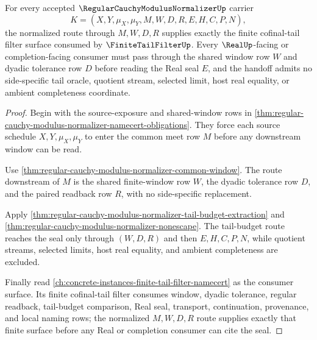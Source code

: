 \begin{theorem}
\label{thm:regular-cauchy-modulus-normalizer-cofinal-filter-handoff}
For every accepted $\RegularCauchyModulusNormalizerUp$ carrier
$$
K=(X,Y,\mu_X,\mu_Y,M,W,D,R,E,H,C,P,N),
$$
the normalized route through $M,W,D,R$ supplies exactly the finite cofinal-tail filter surface consumed by $\FiniteTailFilterUp$. Every $\RealUp$-facing or completion-facing consumer must pass through the shared window row $W$ and dyadic tolerance row $D$ before reading the Real seal $E$, and the handoff admits no side-specific tail oracle, quotient stream, selected limit, host real equality, or ambient completeness coordinate.
\end{theorem}
\begin{proof}
Begin with the source-exposure and shared-window rows in \autoref{thm:regular-cauchy-modulus-normalizer-namecert-obligations}. They force each source schedule $X,Y,\mu_X,\mu_Y$ to enter the common meet row $M$ before any downstream window can be read.

Use \autoref{thm:regular-cauchy-modulus-normalizer-common-window}. The route downstream of $M$ is the shared finite-window row $W$, the dyadic tolerance row $D$, and the paired readback row $R$, with no side-specific replacement.

Apply \autoref{thm:regular-cauchy-modulus-normalizer-tail-budget-extraction} and \autoref{thm:regular-cauchy-modulus-normalizer-nonescape}. The tail-budget route reaches the seal only through $(W,D,R)$ and then $E,H,C,P,N$, while quotient streams, selected limits, host real equality, and ambient completeness are excluded.

Finally read \autoref{ch:concrete-instances-finite-tail-filter-namecert} as the consumer surface. Its finite cofinal-tail filter consumes window, dyadic tolerance, regular readback, tail-budget comparison, Real seal, transport, continuation, provenance, and local naming rows; the normalized $M,W,D,R$ route supplies exactly that finite surface before any Real or completion consumer can cite the seal.
\end{proof}

